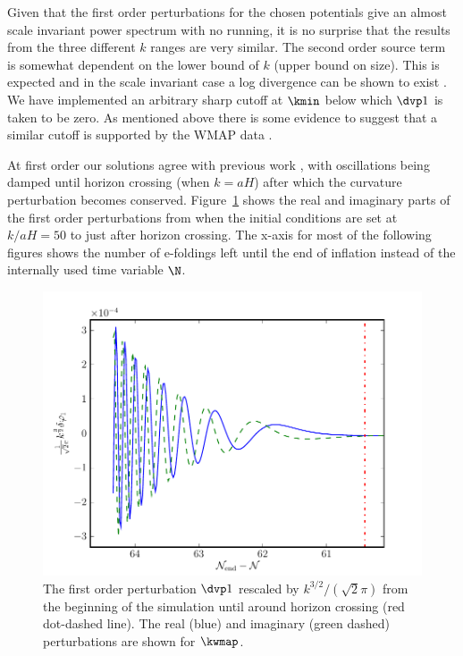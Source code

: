 Given that the first order perturbations for the chosen potentials give an
almost scale invariant power spectrum with no running, it is no surprise that
the results from the three different $k$ ranges are very similar. The second
order source term is somewhat dependent on the lower bound of $k$ (upper bound
on size). This is expected and in the scale invariant case a log divergence can
be shown to exist \cite{Lyth:2007jh}. We have implemented an arbitrary sharp
cutoff at $\kmin$
below
which 
$\dvp1$ is taken to be zero. As mentioned above there is some evidence to
suggest that a 
similar cutoff is supported by the WMAP data \cite{Sinha:2005mn,Kim:2009pf}. 
% 

At first order our solutions agree with previous work
\cite{Salopek:1988qh,Martin:2006rs,Ringeval:2007am}, with oscillations
being damped until horizon crossing (when $k=aH$) after which the
curvature perturbation becomes conserved. Figure~\ref{fig:dp1} shows
the real and imaginary parts of the first order perturbations from
when the initial conditions are set at $k/aH=50$ to just after horizon
crossing. The x-axis for most of the following figures shows the
number of e-foldings left until the end of inflation instead of the
internally used time variable $\N$.
%
% 
\begin{figure}
 \centering
 \includegraphics[scale=0.8]{numerical/graphs/dp1_kwmap}
 \caption{The first order perturbation $\dvp1$ rescaled by
$k^{3/2}/(\sqrt{2}\pi)$ from the beginning of the simulation until around
horizon crossing (red dot-dashed line). The real (blue) and imaginary (green
dashed) perturbations are shown for $\kwmap$.}
\label{fig:dp1}
\end{figure}
% 



